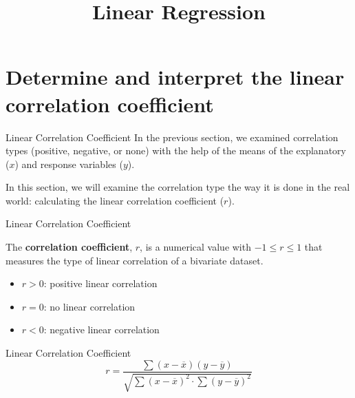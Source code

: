 \documentclass[t]{beamer}
\title{Linear Regression}
\author{}
\date{}
\begin{document}
\begin{frame} 
\maketitle
\end{frame}

\section{Determine and interpret the linear correlation coefficient}

\begin{frame}{Linear Correlation Coefficient}
In the previous section, we examined correlation types (positive, negative, or none) with the help of the means of the explanatory ($x$) and response variables ($y$).	\newline\\	\pause

In this section, we will examine the correlation type the way it is done in the real world: calculating the linear correlation coefficient ($r$).	
\end{frame}

\begin{frame}{Linear Correlation Coefficient}
\begin{tcolorbox}[colframe=green!20!black, colback = green!30!white,title=\textbf{Correlation Coefficient}]
The \textbf{correlation coefficient}, $r$, is a numerical value with $-1 \leq r \leq 1$ that measures the type of linear correlation of a bivariate dataset.
\end{tcolorbox}
\bigskip 

\begin{itemize}
	\item<2->{$r > 0$: positive linear correlation}
	\item<3->{$r = 0$: no linear correlation}
	\item<4->{$r < 0$: negative linear correlation}
\end{itemize}
\end{frame}

\begin{frame}{Linear Correlation Coefficient}
\[r = \frac{\sum (x-\overline{x})(y-\overline{y})}{\sqrt{\sum(x-\overline{x})^2 \cdot \sum(y-\overline{y})^2}}\]	\newline\\	
	\newline\\
	\newline\\
\end{frame}
\end{document}

